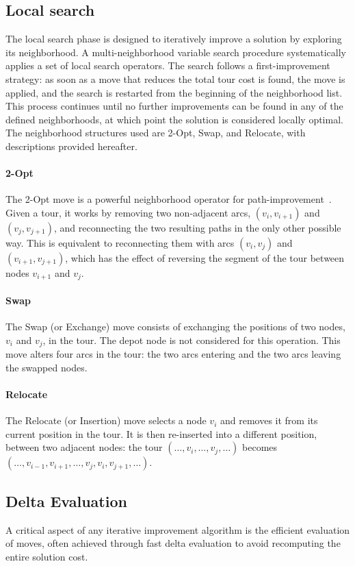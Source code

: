 \documentclass[twocolumn]{article} %
\begin{document}
\subsection{Local search}
The local search phase is designed to iteratively improve a solution by exploring its neighborhood. A multi-neighborhood variable search procedure systematically applies a set of local search operators. The search follows a first-improvement strategy: as soon as a move that reduces the total tour cost is found, the move is applied, and the search is restarted from the beginning of the neighborhood list.
This process continues until no further improvements can be found in any of the defined neighborhoods, at which point the solution is considered locally optimal. The neighborhood structures used are 2-Opt, Swap, and Relocate, with descriptions provided hereafter.

\paragraph{2-Opt} The 2-Opt move is a powerful neighborhood operator for path-improvement~\cite{Croes1958}. Given a tour, it works by removing two non-adjacent arcs, $(v_i, v_{i+1})$ and $(v_j, v_{j+1})$, and reconnecting the two resulting paths in the only other possible way. This is equivalent to reconnecting them with arcs $(v_i, v_j)$ and $(v_{i+1}, v_{j+1})$, which has the effect of reversing the segment of the tour between nodes $v_{i+1}$ and $v_j$.

\paragraph{Swap} The Swap (or Exchange) move consists of exchanging the positions of two nodes, $v_i$ and $v_j$, in the tour. The depot node is not considered for this operation. This move alters four arcs in the tour: the two arcs entering and the two arcs leaving the swapped nodes.

\paragraph{Relocate} The Relocate (or Insertion) move selects a node $v_i$ and removes it from its current position in the tour. It is then re-inserted into a different position, between two adjacent nodes:
the tour $(\ldots, v_i, \ldots, v_j, \ldots)$ becomes $(\ldots, v_{i-1}, v_{i+1}, \ldots, v_j, v_i, v_{j+1}, \ldots)$.

\subsection{Delta Evaluation}
A critical aspect of any iterative improvement algorithm is the efficient evaluation of moves, often achieved through fast delta evaluation to avoid recomputing the entire solution cost.
\end{document}
